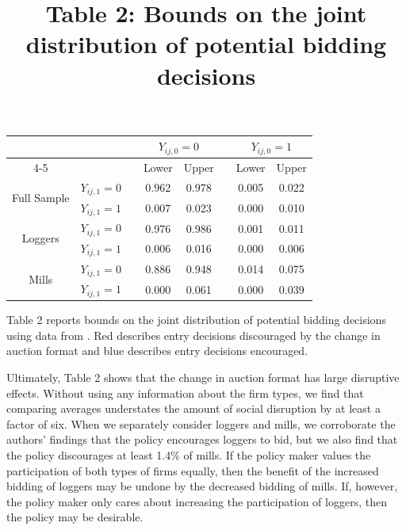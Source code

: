 \documentclass[12pt]{article}
\theoremstyle{definition}
\begin{document}
\begin{table}[htbp]
	\vspace{5mm}
	\centering
	\title{Table 2: Bounds on the joint distribution of potential bidding decisions} \vspace{5mm}
    \begin{tabular}{cccccccc}\hline\hline
	&       &       & \multicolumn{2}{c}{$Y_{ij,0} = 0$} &       & \multicolumn{2}{c}{$Y_{ij,0} = 1$} \\
	\cmidrule{4-5}\cmidrule{7-8}          &       &       & Lower & Upper &       & Lower & Upper \\
	\midrule
    \multirow{2}[0]{*}{Full Sample} & $Y_{ij,1} = 0$ &       & 0.962 & 0.978 &       & \textcolor[rgb]{ .753,  0,  0}{0.005} & \textcolor[rgb]{ .753,  0,  0}{0.022} \\
          & $Y_{ij,1} = 1$ &       & \textcolor[rgb]{ 0,  .439,  .753}{0.007} & \textcolor[rgb]{ 0,  .439,  .753}{0.023} &       & 0.000 & 0.010 \\
    \midrule
    \multirow{2}[0]{*}{Loggers} & $Y_{ij,1} = 0$ &       & 0.976 & 0.986 &       & \textcolor[rgb]{ .753,  0,  0}{0.001} & \textcolor[rgb]{ .753,  0,  0}{0.011} \\
          & $Y_{ij,1} = 1$ &       & \textcolor[rgb]{ 0,  .439,  .753}{0.006} & \textcolor[rgb]{ 0,  .439,  .753}{0.016} &       & 0.000 & 0.006 \\
    \midrule
    \multirow{2}[0]{*}{Mills} & $Y_{ij,1} = 0$ &       & 0.886 & 0.948 &       & \textcolor[rgb]{ .753,  0,  0}{0.014} & \textcolor[rgb]{ .753,  0,  0}{0.075} \\
          & $Y_{ij,1} = 1$ &       & \textcolor[rgb]{ 0,  .439,  .753}{0.000} & \textcolor[rgb]{ 0,  .439,  .753}{0.061} &       & 0.000 & 0.039 \\
	\hline\hline
\end{tabular}%
\begin{flushleft} \footnotesize \linespread{.75} Table 2 reports bounds on the joint distribution of potential bidding decisions using data from \cite{schuster1994sealed}. \textcolor[rgb]{ .753,  0,  0}{Red} describes entry decisions discouraged by the change in auction format and \textcolor[rgb]{ 0,  .439,  .753}{blue} describes entry decisions encouraged.  \normalsize \end{flushleft}
\end{table}%

Ultimately, Table 2 shows that the change in auction format has large disruptive effects. Without using any information about the firm types, we find that comparing averages understates the amount of social disruption by at least a factor of six. When we separately consider loggers and mills, we corroborate the authors' findings that the policy encourages loggers to bid, but we also find that the policy discourages at least 1.4\% of mills. If the policy maker values the participation of both types of firms equally, then the benefit of the increased bidding of loggers may be undone by the decreased bidding of mills. If, however, the policy maker only cares about increasing the participation of loggers, then the policy may be desirable.  
\end{document}
